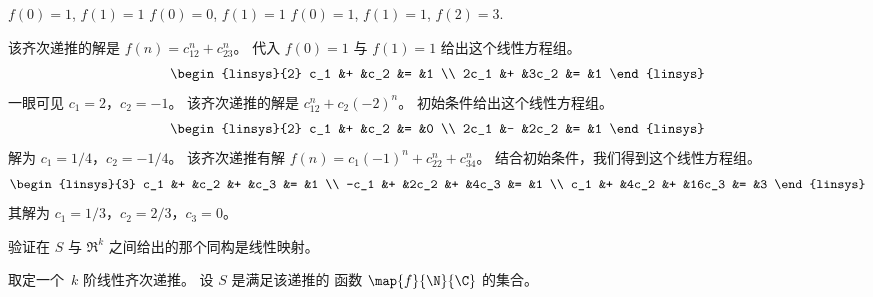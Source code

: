 \begin{exercises}
    \begin{exparts}
      \partsitem $f(0)=1$, $f(1)=1$
      \partsitem $f(0)=0$, $f(1)=1$
      \partsitem $f(0)=1$, $f(1)=1$, $f(2)=3$.      
    \end{exparts}
    \begin{answer}
      \begin{exparts}
        \partsitem 该齐次递推的解是
          $f(n)=c_12^n+c_23^n$。
          代入 $f(0)=1$ 与 $f(1)=1$ 给出这个线性方程组。
          \begin{equation*}
            \begin{linsys}{2}
              c_1 &+ &c_2   &= &1 \\
             2c_1 &+ &3c_2  &= &1
            \end{linsys}
          \end{equation*}
          一眼可见 $c_1=2$，$c_2=-1$。
        \partsitem
          该齐次递推的解是
          $c_12^n+c_2(-2)^n$。
          初始条件给出这个线性方程组。
          \begin{equation*}
            \begin{linsys}{2}
              c_1 &+ &c_2  &= &0  \\
             2c_1 &- &2c_2 &= &1
            \end{linsys}
          \end{equation*}
          解为 $c_1=1/4$，$c_2=-1/4$。
        \partsitem
          该齐次递推有解
          $f(n)=c_1(-1)^n+c_22^n+c_34^n$。
          结合初始条件，我们得到这个线性方程组。
          \begin{equation*}
            \begin{linsys}{3}
              c_1 &+  &c_2   &+  &c_3  &= &1 \\
             -c_1 &+  &2c_2  &+  &4c_3  &= &1 \\
              c_1 &+  &4c_2  &+  &16c_3  &= &3
            \end{linsys}
          \end{equation*}
          其解为 $c_1=1/3$，$c_2=2/3$，$c_3=0$。
      \end{exparts}
    \end{answer}
  \item \label{exer:SeqToRnLinMap}
    验证在 $S$ 与 $\Re^k$ 之间给出的那个同构是线性映射。
    \begin{answer}
      取定一个~$k$ 阶线性齐次递推。
      设 $S$ 是满足该递推的
      函数 $\map{f}{\N}{\C}$ 的集合。

\end{answer}
\end{exercises}
